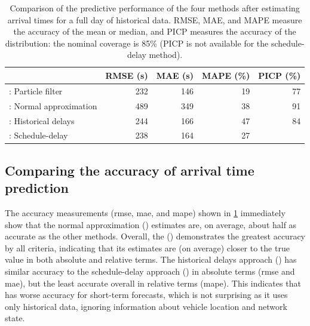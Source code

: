 \begin{knitrout}\small
{}\color{fgcolor}\begin{table}

\caption[Comparison of the predictive performance of the four methods after estimating arrival times for a full day of historical data]{\label{tab:model_results_rmse}Comparison of the predictive performance of the four methods after estimating arrival times for a full day of historical data. RMSE, MAE, and MAPE measure the accuracy of the mean or median, and PICP measures the accuracy of the distribution: the nominal coverage is 85\% (PICP is not available for the schedule-delay method).}
\centering
\fontsize{8}{10}\selectfont
\begin{tabular}[t]{lrrrr}
\toprule
  & RMSE (s) & MAE (s) & MAPE (\%) & PICP (\%)\\
\midrule
\Fpf{}: Particle filter & 232 & 146 & 19 & 77\\
\Fnorm{}: Normal approximation & 489 & 349 & 38 & 91\\
\Fhist{}: Historical delays & 244 & 166 & 47 & 84\\
\Fsched{}: Schedule-delay & 238 & 164 & 27 & \\
\bottomrule
\end{tabular}
\end{table}


\end{knitrout}




\subsection{Comparing the accuracy of arrival time prediction}
\label{sec:prediction_model_comp_stats}

The accuracy measurements (\gls{rmse}, \gls{mae}, and \gls{mape}) shown in \cref{tab:model_results_rmse} immediately show that the normal approximation (\Fnorm{}) estimates are, on average, about half as accurate as the other methods. Overall, the \pf{} (\Fpf{}) demonstrates the greatest accuracy by all criteria, indicating that its estimates are (on average) closer to the true value in both absolute and relative terms. The historical delays approach (\Fhist{}) has similar accuracy to the schedule-delay approach (\Fsched{}) in absolute terms (\gls{rmse} and \gls{mae}), but the least accurate overall in relative terms (\gls{mape}). This indicates that \Fhist{} has worse accuracy for short-term forecasts, which is not surprising as it uses only historical data, ignoring \rt{} information about vehicle location and network state.


